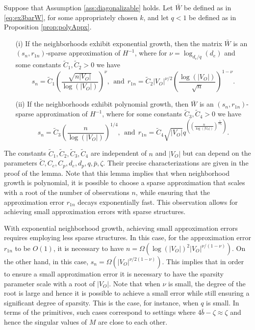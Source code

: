 \documentclass[opre,nonblindrev]{informs3} %
\begin{document}
\begin{lemma}\label{lem:appxDiagonalizable}
	Suppose that Assumption \ref{ass:diagonalizable} holds.
	Let $\bar{W}$ be defined as in
	\eqref{eq:ex3barW}, for some
	appropriately chosen $k$, and let $q<1$ be defined as in Proposition \ref{prop:polyAppx}.
	\begin{itemize}
		\item[(i)] If the neighborhoods exhibit exponential growth, then
		the matrix $\bar{W}$ is an
		$(s_n,r_{1n})$-sparse approximation
		of  $H^{-1}$, where for
		 $\nu=\log_{d_e/q}(d_e )$ 
		 and  some constants $\tilde{C}_1,\tilde{C}_2>0$
		 we have
			$$s_n= \tilde{C}_1
		\left(\frac{ \sqrt{n|V_O|}}{\log(|V_O|)} \right)^{\nu}, \ \
		\mbox{and}
		\ \
		r_{1n}=
		\tilde{C}_2
		{|V_O|}^{\nu/2}
		\left( \frac{\log(|V_O|)}{\sqrt{n} } \right)^{1-\nu}.$$
		 
		
		\item[(ii)] If the neighborhoods exhibit polynomial growth, then
		$\bar{W}$ is an $(s_n,r_{1n})$-sparse approximation
		of  $H^{-1}$, where
		for		 some constants $\tilde{C}_3,\tilde{C}_4>0$
		we have
		$$s_n= \tilde{C}_3
		\left(\frac{n}{\log(|V_O|)}\right)^{1/4}, 
\ \ \mbox{and} \ \ 		
		r_{1n}=
		\tilde{C}_4 {\sqrt{|V_O|}}
		q^{ \left({ {\left(\frac{n}{\log(|V_O|)}\right)^{\frac{1}{4d_p}}} } \right)}
		.$$
	\end{itemize}
	
	
\end{lemma}
The constants 
$\tilde{C}_1,\tilde{C}_2,\tilde{C}_3,\tilde{C}_4$
are independent of $n$ and $|V_O|$ but can depend on the parameters
$\tilde{C}, C_e, C_p, d_e, d_p, q, \bar{p}, \zeta$.
Their precise characterizations are given in the proof of the lemma.
Note that this lemma implies that when neighborhood growth is polynomial, it is possible to choose a sparse approximation
that scales with a root of the  number of observations $n$,
while
ensuring that
the approximation error $r_{1n}$ decays exponentially fast.
This observation allows for achieving small approximation errors with  sparse structures.

With exponential neighborhood growth,
achieving small approximation errors requires employing less sparse structures. In this case,
for the approximation error $r_{1n}$  to be $O(1)$, it is necessary to have $n=\Omega(\log(|V_O|)^2 |V_O|^{\nu/(1-\nu)} )$.
On the other hand, in this case,
$s_n=\Omega(|V_O|^{\nu/2(1-\nu)})$.
This implies that in order to ensure a small approximation error it is necessary to have the sparsity parameter scale with a root of $|V_O|$.
Note that when $\nu$ is small, the degree of the root is large and hence it is possible to achieve a small error while still ensuring a significant degree of sparsity.
This is the case, for instance,
when $q$ is small. In terms of the primitives, such cases correspond to settings where $4\bar{b}- \zeta \approx \zeta $ and hence the singular values of $M$ are close to each other.
\end{document}
